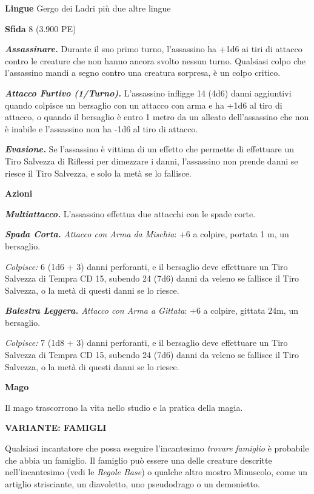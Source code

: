 \begin{multicols}{2}
\textbf{Lingue} Gergo dei Ladri più due altre lingue

\textbf{Sfida} 8 (3.900 PE)

\emph{\textbf{Assassinare.}} Durante il suo primo turno, l'assassino ha +1d6 ai tiri di attacco contro le creature che non hanno ancora svolto nessun turno. Qualsiasi colpo che l'assassino mandi a segno contro una creatura sorpresa, è un colpo critico.

\emph{\textbf{Attacco Furtivo (1/Turno).}} L'assassino infligge 14 (4d6) danni aggiuntivi quando colpisce un bersaglio con un attacco con arma e ha +1d6 al tiro di attacco, o quando il bersaglio è entro 1 metro da un alleato dell'assassino che non è inabile e l'assassino non ha -1d6 al tiro di attacco.

\emph{\textbf{Evasione.}} Se l'assassino è vittima di un effetto che permette di effettuare un Tiro Salvezza di Riflessi per dimezzare i danni, l'assassino non prende danni se riesce il Tiro Salvezza, e solo la metà se lo fallisce.

\textbf{Azioni}

\emph{\textbf{Multiattacco.}} L'assassino effettua due attacchi con le spade corte.

\emph{\textbf{Spada Corta.} Attacco con Arma da Mischia}: +6 a colpire, portata 1 m, un bersaglio.

\emph{Colpisce:} 6 (1d6 + 3) danni perforanti, e il bersaglio deve effettuare un Tiro Salvezza di Tempra CD 15, subendo 24 (7d6) danni da veleno se fallisce il Tiro Salvezza, o la metà di questi danni se lo riesce.

\emph{\textbf{Balestra Leggera.} Attacco con Arma a Gittata}: +6 a colpire, gittata 24m, un bersaglio.

\emph{Colpisce:} 7 (1d8 + 3) danni perforanti, e il bersaglio deve effettuare un Tiro Salvezza di Tempra CD 15, subendo 24 (7d6) danni da veleno se fallisce il Tiro Salvezza, o la metà di questi danni se lo riesce.

\medskip\textbf{Mago}

Il mago trascorrono la vita nello studio e la pratica della magia.

\textbf{VARIANTE: FAMIGLI}

Qualsiasi incantatore che possa eseguire l'incantesimo \emph{trovare} \emph{famiglio} è probabile che abbia un famiglio. Il famiglio può essere una delle creature descritte nell'incantesimo (vedi le \emph{Regole Base}) o qualche altro mostro Minuscolo, come un artiglio strisciante, un diavoletto, uno pseudodrago o un demonietto.


\end{multicols}
